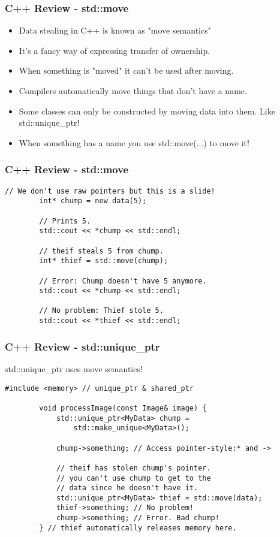 \documentclass{beamer}
\begin{document}
\begin{frame}
	\frametitle{C++ Review - std::move}
	\begin{itemize}
		\item Data stealing in C++ is known as "move semantics"
		\item It's a fancy way of expressing transfer of ownership.
		\item When something is "moved" it can't be used after moving.
		\item Compilers automatically move things that don't have a name.
		\item Some classes can only be constructed by moving data into them. Like std::unique\_ptr!
		\item When something has a name you use std::move(...) to move it!
	\end{itemize}
\end{frame}

\begin{frame}[fragile]
	\frametitle{C++ Review - std::move}
	\begin{lstlisting}[language=nuclear]
		// We don't use raw pointers but this is a slide!
		int* chump = new data(5);

		// Prints 5.
		std::cout << *chump << std::endl;

		// theif steals 5 from chump.
		int* thief = std::move(chump);

		// Error: Chump doesn't have 5 anymore.
		std::cout << *chump << std::endl;

		// No problem: Thief stole 5.
		std::cout << *thief << std::endl;
	\end{lstlisting}
\end{frame}

\begin{frame}[fragile]
	\frametitle{C++ Review - std::unique\_ptr}

	std::unique\_ptr uses move semantics!	

	\begin{lstlisting}[language=nuclear]
		#include <memory> // unique_ptr & shared_ptr

		void processImage(const Image& image) {
		    std::unique_ptr<MyData> chump = 
		        std::make_unique<MyData>();

		    chump->something; // Access pointer-style:* and ->
			
		    // theif has stolen chump's pointer.
		    // you can't use chump to get to the
		    // data since he doesn't have it.
		    std::unique_ptr<MyData> thief = std::move(data); 
		    thief->something; // No problem!
		    chump->something; // Error. Bad chump!
		} // thief automatically releases memory here. 
	\end{lstlisting}
\end{frame}
\end{document}
